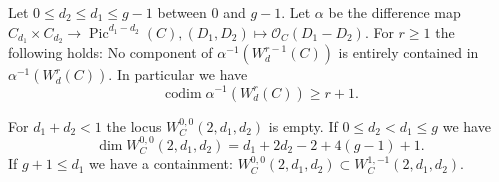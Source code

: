 \documentclass[10pt,a4paper]{amsart}
\newcommand{\OO}{\mathcal{O}}
\newcommand{\op}{\operatorname}
\begin{document}
\begin{lemma}\label{lemma:difference_loci}
Let $0\leq d_2\leq d_1\leq g-1$ between $0$ and $g-1$. Let $\alpha$ be the difference map $C_{d_1}\times C_{d_2}\to \op{Pic}^{d_1-d_2}(C), (D_1,D_2)\mapsto \OO_C(D_1-D_2)$. For $r\geq 1$ the following holds: No component of $\alpha^{-1}(W^{r-1}_d(C))$ is entirely contained in $\alpha^{-1}(W^r_d(C))$. In particular we have
 \begin{equation*}
\op{codim} \alpha^{-1}(W^r_d(C)) \geq r+1.
\end{equation*} 
\end{lemma}

\begin{proposition}\label{prop:unstable_ii}
For $d_1 + d_2 < 1$ the locus $W_C^{0,0}(2,d_1,d_2)$ is empty. If $0 \leq d_2 < d_1 \leq g$ we have
\begin{equation*}
\dim W_C^{0,0}(2,d_1,d_2) = d_1 + 2d_2 -2 + 4(g-1)+1.
\end{equation*}
If $g+1\leq d_1$ we have a containment: $W_C^{0,0}(2,d_1,d_2) \subset W_C^{1,-1}(2,d_1,d_2)$.
\end{proposition}
\end{document}
